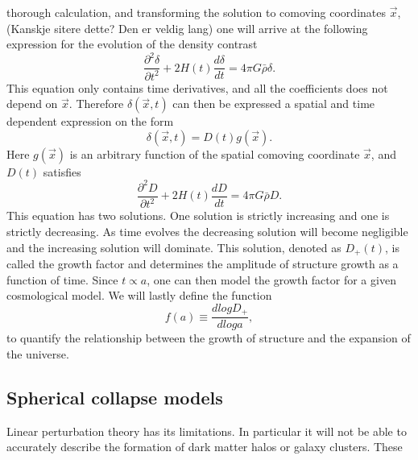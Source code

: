 thorough calculation, and transforming the solution to comoving coordinates $\vec{x}$, (Kanskje sitere dette? Den er veldig lang) one will arrive at the following expression for the
evolution of the density contrast
\begin{equation}
    \frac{\partial^2 \delta}{\partial t^2} + 2H(t) \frac{d \delta}{dt}=4\pi G\bar{\rho}\delta.
\end{equation}
This equation only contains time derivatives, and all the coefficients does not
depend on $\vec{x}$. Therefore $\delta(\vec{x}, t)$ can then be expressed a spatial and time
dependent expression on the form 
\begin{equation}
    \delta(\vec{x}, t) = D(t)g(\vec{x}).
\end{equation}
Here $g(\vec{x})$ is an arbitrary function of the spatial comoving coordinate
$\vec{x}$, and $D(t)$ satisfies
\begin{equation}
    \frac{\partial^2 D}{\partial t^2} + 2H(t) \frac{d D}{dt}=4\pi G\bar{\rho}D.
\end{equation}
This equation has two solutions. One solution is strictly increasing and one is
strictly decreasing. As time evolves the decreasing solution will become negligible
and the increasing solution will dominate. This solution, denoted as $D_+(t)$,
is called the growth factor and determines the amplitude of structure growth as
a function of time. Since $t\propto a$, one can then model the growth factor for
a given cosmological model. We will lastly define the function
\begin{equation}\label{eq:growthfac}
    f(a) \equiv \frac{d log D_+}{d log a},
\end{equation}
to quantify the relationship between the growth of structure and the expansion
of the universe.
\subsection{Spherical collapse models}
Linear perturbation theory has its limitations. In particular it will not be
able to accurately describe the formation of dark matter halos or galaxy
clusters. These 

